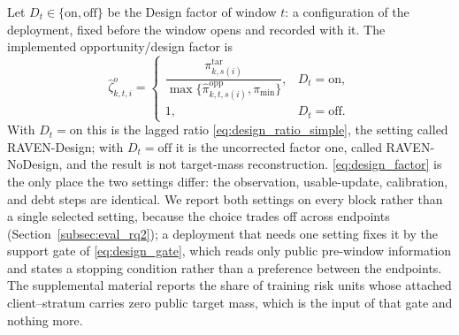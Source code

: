 \documentclass[letterpaper,journal]{IEEEtran}
\begin{document}
Let $D_t\in\{\mathrm{on},\mathrm{off}\}$ be the Design factor of window $t$:
a configuration of the deployment, fixed before the window opens and recorded
with it.  The implemented opportunity/design factor is
\begin{equation}
\widehat\zeta^{o}_{k,t,i}
=
\begin{cases}
\dfrac{\pi^{\mathrm{tar}}_{k,s(i)}}
{\max\{\widehat\pi^{\mathrm{opp}}_{k,t,s(i)},\pi_{\min}\}}, & D_t=\mathrm{on},\\[1.5mm]
1, & D_t=\mathrm{off}.
\end{cases}
\label{eq:design_factor}
\end{equation}
With $D_t=\mathrm{on}$ this is the lagged ratio
\eqref{eq:design_ratio_simple}, the setting called RAVEN-Design; with
$D_t=\mathrm{off}$ it is the uncorrected factor one, called RAVEN-NoDesign,
and the result is not target-mass reconstruction.
\eqref{eq:design_factor} is the only place the two settings differ: the
observation, usable-update, calibration, and debt steps are identical.
We report both settings on every block rather than a single selected setting,
because the choice trades off across endpoints
(Section~\ref{subsec:eval_rq2}); a deployment that needs one setting fixes it by
the support gate of \eqref{eq:design_gate}, which reads only public pre-window
information and states a stopping condition rather than a preference between the
endpoints.
The supplemental material reports the share of training risk units whose
attached client--stratum carries zero public target mass, which is the input of
that gate and nothing more.
\end{document}
